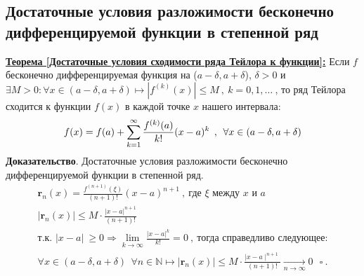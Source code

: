 \documentclass[a4paper,12pt]{article} %
\begin{document}
\subsection{Достаточные условия разложимости бесконечно дифференцируемой функции в степенной ряд}
\underline{\textbf{Теорема [Достаточные условия сходимости ряда Тейлора к функции]:}} 
Если $f$ бесконечно дифференцируемая функция на ($a - \delta , a + \delta$), $\delta > 0$ и $\exists M > 0 : \forall x \in (a - \delta, a + \delta) \mapsto |f^{(k)}(x)| \leqslant M\ ,\ k = 0,1,\dots \ $, то ряд Тейлора сходится к функции $f(x)$ в каждой точке $x$ нашего интервала:
\begin{equation*}
\Large \displaystyle f(x) =f(a) + \sum\limits_{k = 1}^{\infty} \frac{f^{(k)}(a)}{k!}(x-a)^k\ ,\ \forall x\in (a - \delta, a + \delta)
\end{equation*}
\textbf{Доказательство}. Достаточные условия разложимости бесконечно дифференцируемой функции в степенной ряд.
\begin{equation*}
\begin{gathered}
	\mathbf{r}_n(x) = \frac{f^{(n+1)}(\xi)}{(n+1)!}(x-a)^{n+1}\ ,\ \text{где } \xi \text{ между } x \text{ и } a  \\
	|\mathbf{r}_n(x)| \leqslant M\cdot \frac{|x - a|^{n+1}}{(n+1)!}\\
	\text{т.к.  }|x - a|\ \geqslant 0 \Rightarrow \lim\limits_{k \to \infty} \frac{|x - a|^k}{k!} = 0\ ,\ \text{тогда справедливо следующее:}\\
	\forall x \in (a - \delta, a + \delta)\ \ \forall n\in \mathbb{N} \longmapsto |\mathbf{r}_n(x)| 	\leqslant M \cdot \frac{\mid x - a\mid^{n+1}}{(n + 1)!} \underset{n \rightarrow \infty} \longrightarrow 0\ \ \ \square\ .
\end{gathered}
\end{equation*}
\end{document}
